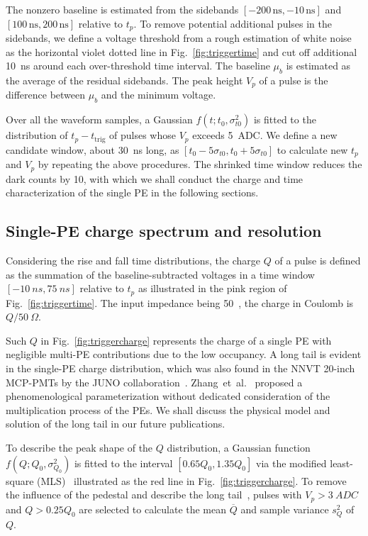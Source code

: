 The nonzero baseline is estimated from the sidebands $[-200\,\mathrm{ns},-10\,\mathrm{ns}]$ and $[100\,\mathrm{ns},200\,\mathrm{ns}]$ relative to $t_p$. %
To remove potential additional pulses in the sidebands, we define a voltage threshold from a rough estimation of white noise as the horizontal violet dotted line in Fig.~\ref{fig:triggertime} and cut off additional \SI{10}{ns} around each over-threshold time interval. The baseline $\mu_b$ is estimated as the average of the residual sidebands. The peak height $V_p$ of a pulse is the difference between $\mu_b$ and the minimum voltage.

Over all the waveform samples, a Gaussian $f(t;t_0,\sigma_{t0}^2)$ is fitted to the distribution of $t_p-t_{\mathrm{trig}}$ of pulses whose $V_p$ exceeds \SI{5}{ADC}. We define a new candidate window, about \SI{30}{ns} long, as $[t_0-5\sigma_{t0}, t_0+5\sigma_{t0}]$ to calculate new $t_p$ and $V_p$ by repeating the above procedures.  The shrinked time window reduces the dark counts by 10, with which we shall conduct the charge and time characterization of the single PE in the following sections.

\subsection{Single-PE charge spectrum and resolution}
\label{sec:noisepeak}

Considering the rise and fall time distributions, the charge $Q$ of a pulse is defined as %
the summation of the baseline-subtracted voltages in a time window $[\SI{-10}{ns}, \SI{75}{ns}]$ relative to $t_p$ as illustrated in the pink region of Fig.~\ref{fig:triggertime}. The input impedance being \SI{50}{\Omega}~\cite{CAENV1751}, the charge in Coulomb is $Q/\SI{50}{\Omega}$.

Such $Q$ in Fig.~\ref{fig:triggercharge} represents the charge of a single PE with negligible multi-PE contributions due to the low occupancy. A long tail is evident in the single-PE charge distribution, which was also found in the NNVT 20-inch MCP-PMTs by the JUNO collaboration~\cite{JUNOMassTesting}. Zhang~et~al.~\cite{JUNOLongtail} proposed a phenomenological parameterization without dedicated consideration of the multiplication process of the PEs. We shall discuss the physical model and solution of the long tail in our future publications.

To describe the peak shape of the $Q$ distribution, a Gaussian function $f(Q;Q_0,\sigma^2_{Q_0})$ is fitted to the interval $[0.65Q_0, 1.35Q_0]$ via the modified least-square (MLS)~\cite{Cowan1998StatisticalDA} illustrated as the red line in Fig.~\ref{fig:triggercharge}. To remove the influence of the pedestal and describe the long tail~\cite{JUNOLongtail}, pulses with $V_p>\SI{3}{ADC}$ and $Q>0.25Q_0$ are selected to calculate the mean $\overline{Q}$ and sample variance $s^2_{Q}$ of $Q$.

